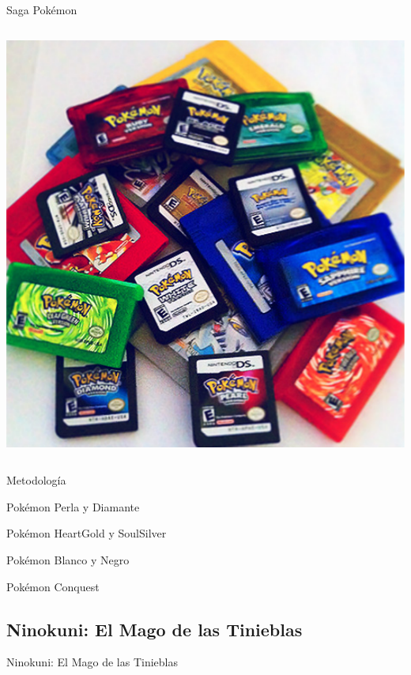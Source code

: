 \begin{frame}{Saga Pokémon}
\begin{columns}
  \begin{column}{0.4\textwidth}
    \includegraphics[width=\textwidth]{imgs/pokemon_cart.pdf}
  \end{column}
\end{columns}

\end{frame}

\begin{frame}{Metodología}
\end{frame}

\begin{frame}{Pokémon Perla y Diamante}

\end{frame}

\begin{frame}{Pokémon HeartGold y SoulSilver}

\end{frame}

\begin{frame}{Pokémon Blanco y Negro}

\end{frame}

\begin{frame}{Pokémon Conquest}

\end{frame}

\subsection{Ninokuni: El Mago de las Tinieblas}
\begin{frame}{Ninokuni: El Mago de las Tinieblas}

\end{frame}
